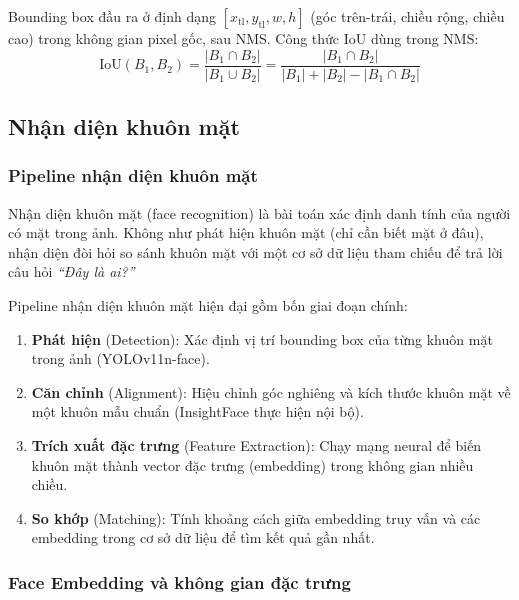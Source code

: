 \medskip
Bounding box đầu ra ở định dạng $[x_\text{tl}, y_\text{tl}, w, h]$ (góc trên-trái, chiều rộng, chiều cao) trong không gian pixel gốc, sau NMS. Công thức IoU dùng trong NMS:
\begin{equation}
    \text{IoU}(B_1, B_2) = \frac{|B_1 \cap B_2|}{|B_1 \cup B_2|} = \frac{|B_1 \cap B_2|}{|B_1| + |B_2| - |B_1 \cap B_2|}
    \label{eq:iou_nms}
\end{equation}

\subsection{Nhận diện khuôn mặt}
\label{subsec:nhandien}

\subsubsection{Pipeline nhận diện khuôn mặt}
\label{subsubsec:pipeline_recognition}

Nhận diện khuôn mặt (face recognition) là bài toán xác định danh tính của người có mặt trong ảnh. Không như phát hiện khuôn mặt (chỉ cần biết mặt ở đâu), nhận diện đòi hỏi so sánh khuôn mặt với một cơ sở dữ liệu tham chiếu để trả lời câu hỏi \textit{``Đây là ai?''}

\medskip
Pipeline nhận diện khuôn mặt hiện đại gồm bốn giai đoạn chính:

\begin{enumerate}[1.]
    \item \textbf{Phát hiện} (Detection): Xác định vị trí bounding box của từng khuôn mặt trong ảnh (YOLOv11n-face).
    \item \textbf{Căn chỉnh} (Alignment): Hiệu chỉnh góc nghiêng và kích thước khuôn mặt về một khuôn mẫu chuẩn (InsightFace thực hiện nội bộ).
    \item \textbf{Trích xuất đặc trưng} (Feature Extraction): Chạy mạng neural để biến khuôn mặt thành vector đặc trưng (embedding) trong không gian nhiều chiều.
    \item \textbf{So khớp} (Matching): Tính khoảng cách giữa embedding truy vấn và các embedding trong cơ sở dữ liệu để tìm kết quả gần nhất.
\end{enumerate}

\subsubsection{Face Embedding và không gian đặc trưng}
\label{subsubsec:embedding}

